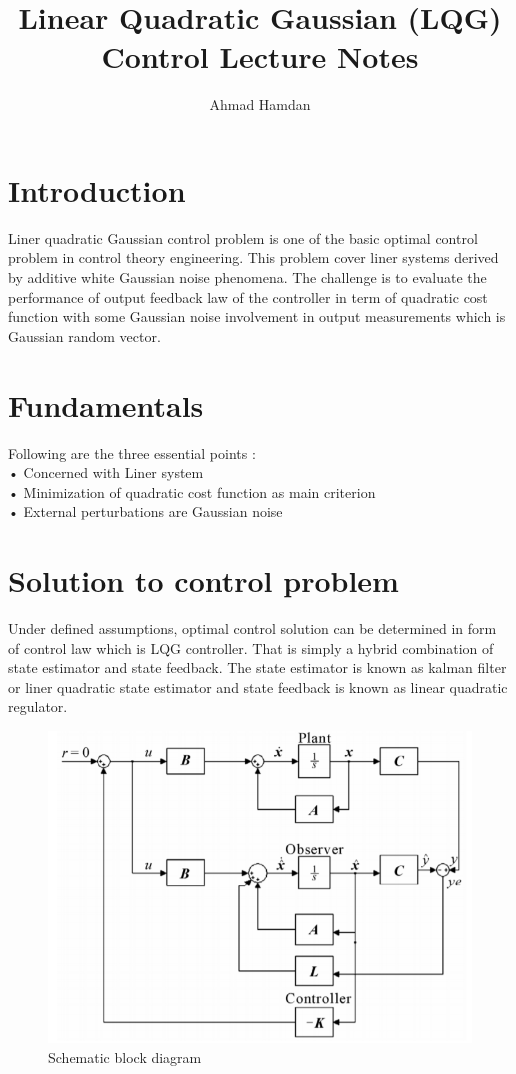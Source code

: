 \documentclass[12pt,a4paper]{article}
\begin{document}
\title{Linear Quadratic Gaussian (LQG) Control Lecture Notes} 
\author {Ahmad Hamdan}
\maketitle
\newpage
\section*{Introduction}
Liner quadratic Gaussian control problem is one of the basic optimal control problem in control theory engineering. This problem cover liner systems derived by additive white Gaussian noise phenomena. The challenge is to evaluate the performance of output feedback law of the controller in term of quadratic cost function with some Gaussian noise involvement in output measurements which is Gaussian random vector.
\section*{Fundamentals}
Following are the three essential points :\\

•	Concerned with Liner system\\

•	Minimization of quadratic cost function as main criterion\\

•	External perturbations are Gaussian noise
\section*{Solution to control problem}
Under defined assumptions, optimal control solution can be determined in form of control law which is LQG controller. That is simply a hybrid combination of state estimator and state feedback. The state estimator is known as kalman filter or liner quadratic state estimator and state feedback is known as linear quadratic regulator.\cite{aastrom2012introduction}

\begin{figure}[h]
  \centering
  \includegraphics[width=2.99 in]{l.PNG}
  \caption{Schematic block diagram}\label{1}
\end{figure}
\end{document}
